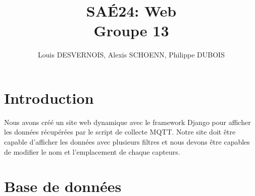 \documentclass{article}
\author{Louis DESVERNOIS, Alexis SCHOENN, Philippe DUBOIS}
\title{%
    SAÉ24: Web \\
    \large Groupe 13}
\begin{document}
\maketitle
\tableofcontents
\listoffigures
\listoflistings

\newpage
\section{Introduction}
Nous avons créé un site web dynamique avec le framework Django pour afficher les données récupérées par le script de collecte MQTT.
Notre site doit être capable d'afficher les données avec plusieurs filtres et nous devons être capables de modifier le nom et l'emplacement de chaque capteurs.

\section{Base de données}
\end{document}
